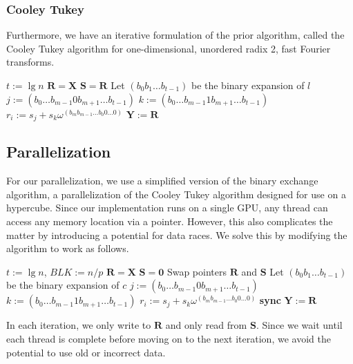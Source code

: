 \documentclass[notitlepage, twocolumn]{article}
\begin{document}
\subsubsection{Cooley Tukey}

Furthermore, we have an iterative formulation of the prior algorithm, called the Cooley Tukey algorithm for one-dimensional, unordered radix 2, fast Fourier transforms.

\begin{algorithmic}[1]
		\State $t:=\lg n$
		\State $\mathbf{R}=\mathbf{X}$
			\State $\mathbf{S}=\mathbf{R}$
				\State Let $(b_0b_1\ldots b_{t-1})$ be the binary expansion of $l$
				\State $j:=(b_0\ldots b_{m-1}0b_{m+1}\ldots b_{t-1})$
				\State $k:=(b_0\ldots b_{m-1}1b_{m+1}\ldots b_{t-1})$
				\State $r_i:= s_j+s_k\omega^{(b_mb_{m-1}\ldots b_0 0\ldots0)}$
			\EndFor
		\EndFor
		\State $\mathbf{Y}:=\mathbf{R}$
	\EndFunction
\end{algorithmic}

\subsection{Parallelization}

For our parallelization, we use a simplified version of the binary exchange algorithm, a parallelization of the Cooley Tukey algorithm designed for use on a hypercube.
Since our implementation runs on a single GPU, any thread can access any memory location via a pointer.
However, this also complicates the matter by introducing a potential for data races.
We solve this by modifying the algorithm to work as follows.

\begin{algorithmic}[1]
		\State $t:=\lg n$, $BLK:=n/p$
		\State $\mathbf{R}=\mathbf{X}$
		\State $\mathbf{S}=\mathbf{0}$
			\State Swap pointers $\mathbf{R}$ and $\mathbf{S}$
					\State Let $(b_0b_1\ldots b_{t-1})$ be the binary expansion of $c$
					\State $j:=(b_0\ldots b_{m-1}0b_{m+1}\ldots b_{t-1})$
					\State $k:=(b_0\ldots b_{m-1}1b_{m+1}\ldots b_{t-1})$
					\State $r_i:= s_j+s_k\omega^{(b_mb_{m-1}\ldots b_0 0\ldots0)}$
				\EndFor
			\EndSpawn
			\State \textbf{sync}
		\EndFor
		\State $\mathbf{Y}:=\mathbf{R}$
	\EndFunction
\end{algorithmic}
In each iteration, we only write to $\mathbf{R}$ and only read from $\mathbf{S}$.
Since we wait until each thread is complete before moving on to the next iteration, we avoid the potential to use old or incorrect data.
\end{document}
